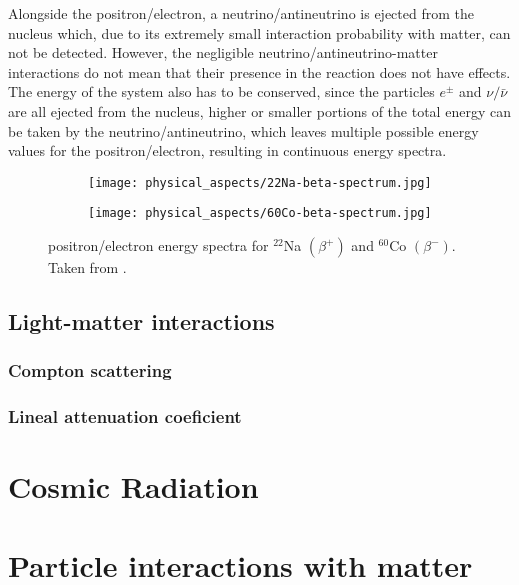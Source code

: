 Alongside the positron/electron, a neutrino/antineutrino is ejected from the nucleus which, due to its extremely small interaction probability with matter, can not be detected. However, the negligible neutrino/antineutrino-matter interactions do not mean that their presence in the reaction does not have effects. The energy of the system also has to be conserved, since the particles $e^{\pm}$ and $\nu/\bar{\nu}$ are all ejected from the nucleus, higher or smaller portions of the total energy can be taken by the neutrino/antineutrino, which leaves multiple possible energy values for the positron/electron, resulting in continuous energy spectra.

\begin{figure}[H]
    \centering
    \begin{subfigure}[t]{0.45\textwidth}
      \texttt{[image: physical\_aspects/22Na-beta-spectrum.jpg]}
      \caption{\label{sfig:22Na_beta_spectra}}
    \end{subfigure}
    \begin{subfigure}[t]{0.45\textwidth}
      \texttt{[image: physical\_aspects/60Co-beta-spectrum.jpg]}
      \caption{\label{sfig:60Co_beta_spectra}}
    \end{subfigure}
    \caption{\label{fig:beta_spectra}positron/electron energy spectra for   $^{22}$Na $(\beta^+)$ and   $^{60}$Co $(\beta^-)$. Taken from \cite{IAEA}.}
\end{figure}

\subsection{Light-matter interactions}

\subsubsection{Compton scattering}

\subsubsection{Lineal attenuation coeficient}

\section{Cosmic Radiation}

\section{Particle interactions with matter}